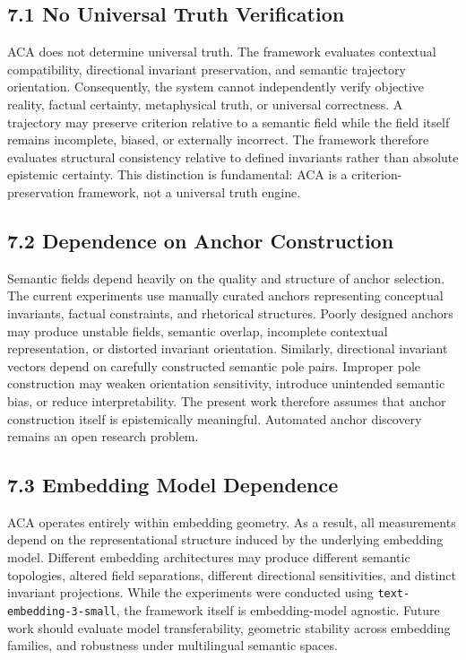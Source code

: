 \documentclass[11pt]{article}
\begin{document}
\subsection{7.1 No Universal Truth Verification}

ACA does not determine universal truth. The framework evaluates contextual compatibility, directional invariant preservation, and semantic trajectory orientation. Consequently, the system cannot independently verify objective reality, factual certainty, metaphysical truth, or universal correctness. A trajectory may preserve criterion relative to a semantic field while the field itself remains incomplete, biased, or externally incorrect. The framework therefore evaluates structural consistency relative to defined invariants rather than absolute epistemic certainty. This distinction is fundamental: ACA is a criterion-preservation framework, not a universal truth engine.

\subsection{7.2 Dependence on Anchor Construction}

Semantic fields depend heavily on the quality and structure of anchor selection. The current experiments use manually curated anchors representing conceptual invariants, factual constraints, and rhetorical structures. Poorly designed anchors may produce unstable fields, semantic overlap, incomplete contextual representation, or distorted invariant orientation. Similarly, directional invariant vectors depend on carefully constructed semantic pole pairs. Improper pole construction may weaken orientation sensitivity, introduce unintended semantic bias, or reduce interpretability. The present work therefore assumes that anchor construction itself is epistemically meaningful. Automated anchor discovery remains an open research problem.

\subsection{7.3 Embedding Model Dependence}

ACA operates entirely within embedding geometry. As a result, all measurements depend on the representational structure induced by the underlying embedding model. Different embedding architectures may produce different semantic topologies, altered field separations, different directional sensitivities, and distinct invariant projections. While the experiments were conducted using \texttt{text-embedding-3-small}, the framework itself is embedding-model agnostic. Future work should evaluate model transferability, geometric stability across embedding families, and robustness under multilingual semantic spaces.
\end{document}
